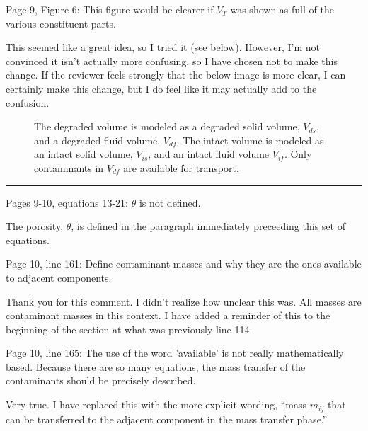 \documentclass[answers,12pt]{exam}
\begin{document}
\begin{questions}
\question Page 9, Figure 6: This figure would be clearer if $V_T$ was shown as 
full of the various constituent parts.  \begin{solution}
This seemed like a great idea, so I tried it (see below). However, I'm not 
        convinced it isn't actually more confusing, so I have chosen not to 
        make this
change. If the reviewer feels strongly that the below image is more clear, I
can certainly make this change, but I do feel like it may actually add to the 
        confusion.
\end{solution} 


\begin{figure}[h!]
  \begin{center}
    \def\svgwidth{\columnwidth}
    
  \end{center}
  \caption[Constituents of a Mixed Cell Control Volume]{The degraded volume is
  modeled as a degraded solid volume, $V_{ds}$, and a degraded fluid volume,
  $V_{df}$. The intact volume is modeled as an intact solid volume, $V_{is}$, 
        and
  an intact fluid volume $V_{if}$.  Only contaminants in $V_{df}$ are available
  for transport.}
  \label{fig:deg_sorb_volumes}
\end{figure}

\noindent\rule{\textwidth}{0.4pt}

\question Pages 9-10, equations 13-21: $\theta$  is not defined.  
\begin{solution}
The porosity, $\theta$, is defined in the paragraph immediately preceeding this 
        set of equations.
\end{solution} 
 
\question Page  10,  line  161:  Define  contaminant  masses  and  why  they  
are  the  ones  available  to  adjacent  components.  \begin{solution}
Thank you for this comment. I didn't realize how unclear this was. All masses
are contaminant masses in this context. I have added a reminder of this to the
beginning of the section at what was previously line 114.
\end{solution} 
 
\question Page  10,  line  165:  The  use  of the word 'available' is not 
really mathematically based. Because there are so many equations, the mass 
transfer of the contaminants should be precisely described.  \begin{solution}
Very true. I have replaced this with the more explicit wording, ``mass $m_{ij}$
that can be transferred to the adjacent component in the mass transfer phase.''
\end{solution} 
 

\end{questions}
\end{document}
